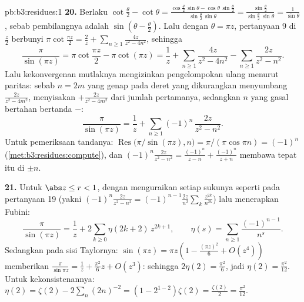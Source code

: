 \begin{solution}{pb:b3:residues:1}
\textbf{20.} Berlaku $\cot\frac\theta2 - \cot\theta =
\frac{\cos\frac\theta2\,\sin\theta -
\cos\theta\,\sin\frac\theta2}{\sin\frac\theta2\,\sin\theta}
= \frac{\sin\frac\theta2}{\sin\frac\theta2\,\sin\theta} =
\frac1{\sin\theta}$, sebab pembilangnya adalah $\sin(\theta -
\frac\theta2)$. Lalu dengan $\theta = \pi z$, pertanyaan 9 di
$\frac z2$ berbunyi $\pi\cot\frac{\pi z}2 = \frac2z +
\sum_{n\geq1}\frac{4z}{z^2 - 4n^2}$, sehingga
\[
\frac{\pi}{\sin(\pi z)}
= \pi\cot\frac{\pi z}2 - \pi\cot(\pi z)
= \frac1z + \sum_{n\geq1}\frac{4z}{z^2 - 4n^2}
- \sum_{n\geq1}\frac{2z}{z^2 - n^2} .
\]
Lalu kekonvergenan mutlaknya mengizinkan pengelompokan ulang menurut paritas: sebab $n
= 2m$ yang genap pada deret yang dikurangkan menyumbang
$\frac{2z}{z^2-4m^2}$, menyisakan $+\frac{2z}{z^2-4m^2}$ dari
jumlah pertamanya, sedangkan $n$ yang gasal bertahan bertanda $-$:
\[
\frac{\pi}{\sin(\pi z)} = \frac1z +
\sum_{n\geq1}(-1)^n\,\frac{2z}{z^2 - n^2} .
\]
Untuk pemeriksaan tandanya: $\operatorname{Res}\bigl(\pi/\sin(\pi z),
n\bigr) = \pi/(\pi\cos\pi n) = (-1)^n$
(\cref{met:b3:residues:compute}), dan $(-1)^n\frac{2z}{z^2 -
n^2} = \frac{(-1)^n}{z-n} + \frac{(-1)^n}{z+n}$ membawa
tepat  itu di $\pm n$.

\textbf{21.} Untuk $\abs z \leq r < 1$, dengan menguraikan setiap sukunya seperti
pada pertanyaan 19 (yakni $(-1)^n\frac{2z}{z^2-n^2} =
(-1)^{n-1}\frac{2z}{n^2}\sum_k\frac{z^{2k}}{n^{2k}}$) lalu
menerapkan Fubini:
\[
\frac{\pi}{\sin(\pi z)} = \frac1z +
2\sum_{k\geq0}\eta(2k+2)\,z^{2k+1},
\qquad
\eta(s) = \sum_{n\geq1}\frac{(-1)^{n-1}}{n^s} .
\]
Sedangkan pada sisi Taylornya: $\sin(\pi z) = \pi z(1 - \frac{(\pi z)^2}6 +
O(z^4))$ memberikan $\frac\pi{\sin\pi z} = \frac1z +
\frac{\pi^2}6z + O(z^3)$: sehingga $2\eta(2) = \frac{\pi^2}6$, jadi
$\eta(2) = \frac{\pi^2}{12}$. Untuk kekonsistenannya: $\eta(2) =
\zeta(2) - 2\sum_n(2n)^{-2} = (1 - 2^{1-2})\zeta(2) =
\frac{\zeta(2)}2 = \frac{\pi^2}{12}$.


\end{solution}
